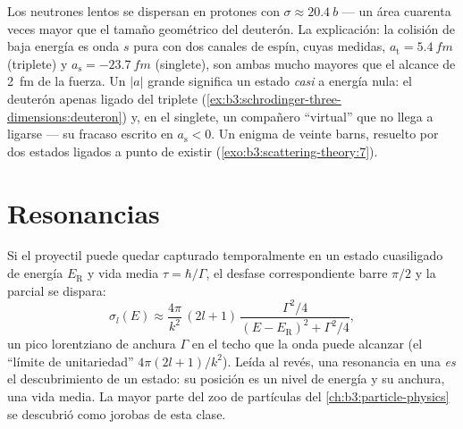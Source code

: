 \begin{example}\label{ex:b3:scattering-theory:np}
Los neutrones lentos se dispersan en protones con $\sigma \approx
\qty{20.4}{b}$ --- un área cuarenta veces mayor que el tamaño geométrico del
deuterón. La explicación: la colisión de baja energía es onda $s$ pura
con dos canales de espín, cuyas  medidas,
$a_{\text{t}} = \qty{5.4}{fm}$ (triplete) y $a_{\text{s}} =
\qty{-23.7}{fm}$ (singlete), son ambas mucho mayores que el alcance de
\qty{2}{fm} de la fuerza. Un $|a|$ grande significa un estado \emph{casi}
a energía nula: el deuterón apenas ligado del triplete
(\cref{ex:b3:schrodinger-three-dimensions:deuteron}) y, en el
singlete, un compañero ``virtual'' que no llega a ligarse --- su
fracaso escrito en $a_{\text{s}} < 0$. Un enigma de veinte barns,
resuelto por dos estados ligados a punto de existir
(\cref{exo:b3:scattering-theory:7}).
\end{example}

\section{Resonancias}

\begin{proposition}\label{prop:b3:scattering-theory:resonance}
Si el proyectil puede quedar capturado temporalmente en un estado
cuasiligado de energía $E_{\text{R}}$ y vida media $\tau = \hbar/\Gamma$,
el desfase correspondiente barre $\pi/2$ y la  parcial se
dispara:
\[
\sigma_l(E) \approx \frac{4\pi}{k^2}\,(2l+1)\,
\frac{\Gamma^2/4}{(E - E_{\text{R}})^2 + \Gamma^2/4} ,
\]
un pico lorentziano de anchura $\Gamma$ en el techo que la onda puede
alcanzar (el ``límite de unitariedad'' $4\pi(2l+1)/k^2$). Leída al revés,
una resonancia en una  \emph{es} el descubrimiento de un
estado: su posición es un nivel de energía y su anchura, una vida media. La
mayor parte del zoo de partículas del \cref{ch:b3:particle-physics} se
descubrió como jorobas de esta clase.
\end{proposition}
\admitted

